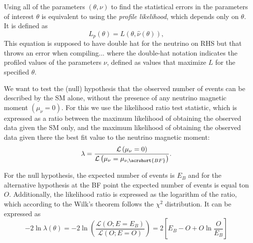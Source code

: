 Using all of the parameters $\left(\theta,\nu\right)$  to find the statistical errors in the parameters of interest $\theta$ is equivalent to using the \textit{profile likelihood}, which depends only on $\theta$. It is defined as
\begin{equation}
L_p\left(\theta\right)=L\left(\theta,\hat{\nu}\left(\theta\right)\right),
\end{equation}
This equation is supposed to have double hat for the neutrino on RHS but that throws an error when compiling...
where the double-hat notation indicates the profiled values of the parameters $\nu$, defined as values that maximize $L$ for the specified $\theta$.


We want to test the (null) hypothesis that the observed number of events can be described by the \gls{SM} alone, without the presence of any neutrino magnetic moment $\left(\mu_\nu=0\right)$. For this we use the likelihood ratio test statistic, which is expressed as a ratio between the maximum likelihood of obtaining the observed data given the \gls{SM} only, and the maximum likelihood of obtaining the observed data given there the best fit value to the neutrino magnetic moment:
\begin{equation}
\lambda=\frac{\mathcal{L}\left(\mu_\nu=0\right)}{\mathcal{L}\left(\mu_\nu=\mu_{\nu,\acrshort{BF}}\right)}.
\end{equation}


For the null hypothesis, the expected number of events is $E_B$ and for the alternative hypothesis at the \gls{BF} point the expected number of events is equal ton $O$. Additionally, the likelihood ratio is expressed as the logarithm of the ratio, which according to the Wilk's theorem follows the $\chi^2$ distribution. It can be expressed as
\begin{equation}
-2\ln\lambda\left(\theta\right)=
-2\ln\left(\frac{\mathcal{L}\left(O;E=E_B\right)}{\mathcal{L}\left(O;E=O\right)}\right)=
2\left[E_B-O+O\ln\frac{O}{E_B}\right]
\end{equation}


